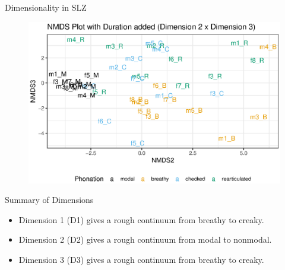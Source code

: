 \documentclass{beamer}
\begin{document}
\begin{frame}{Dimensionality in SLZ}
  \begin{figure}
    \centering
    \includegraphics[width = 0.8\linewidth]{images/MDS/nmds23_dur.eps}
  \end{figure}
\end{frame}

\begin{frame}{Summary of Dimensions}
  \begin{itemize}
    \item Dimension 1 (D1) gives a rough continuum from breathy to creaky.
    \item Dimension 2 (D2) gives a rough continuum from modal to nonmodal.
    \item Dimension 3 (D3) gives a rough continuum from breathy to creaky.
  \end{itemize}
\end{frame}
\end{document}
